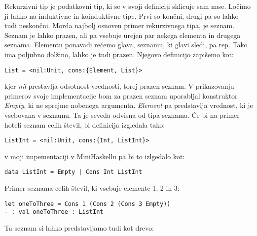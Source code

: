 \documentclass[12pt,a4paper,openany]{book}
\begin{document}
Rekurzivni tip je podatkovni tip, ki se v svoji definiciji sklicuje sam nase. Ločimo ji lahko na induktivne in koinduktivne tipe. Prvi so končni, drugi pa so lahko tudi neskončni. 
Morda najbolj osnoven primer rekurzivnega tipa, je seznam. Seznam je lahko prazen, ali pa vsebuje urejen par nekega elementa in drugega seznama. Elementu ponavadi rečemo glava, seznamu, 
ki glavi sledi, pa rep. Tako ima poljubno dolžino, lahko je tudi prazen. Njegovo definicijo zapišemo kot:
\begin{lstlisting}
List = <nil:Unit, cons:{Element, List}>
\end{lstlisting}
kjer \emph{nil} prestavlja odsotnost vrednosti, torej prazen seznam. V prikazovanju primerov svoje implementacije bom za prazen seznam uporabljal konstruktor \emph{Empty}, 
ki ne sprejme nobenega argumenta. \emph{Element} pa predstavlja vrednost, ki je vsebovana v seznamu. Ta je seveda odvisna od tipa seznama. Če bi na primer hoteli seznam celih števil, 
bi definicija izgledala tako:
\begin{lstlisting}
ListInt = <nil:Unit, cons:{Int, ListInt}>
\end{lstlisting}
v moji impementaciji v MiniHaskellu pa bi to izlgedalo kot:
\begin{lstlisting}
data ListInt = Empty | Cons Int ListInt
\end{lstlisting}
Primer seznama celih števil, ki vsebuje elemente 1, 2 in 3:
\begin{lstlisting}
let oneToThree = Cons 1 (Cons 2 (Cons 3 Empty))
- : val oneToThree : ListInt
\end{lstlisting}

Ta seznam si lahko predstavljamo tudi kot drevo:

\begin{center}
\end{center}
\end{document}
